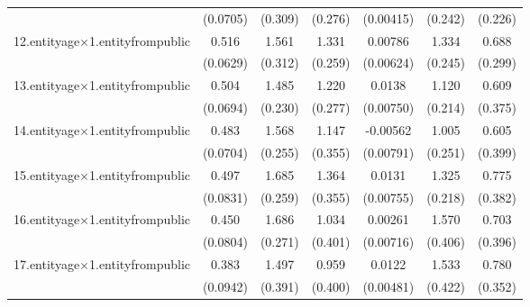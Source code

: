 {\begin{tabular}{l*{6}{c}}
            &    (0.0705)         &     (0.309)         &     (0.276)         &   (0.00415)         &     (0.242)         &     (0.226)         \\
[1em]
12.entityage$\times$1.entityfrompublic&       0.516\sym{***}&       1.561\sym{***}&       1.331\sym{***}&     0.00786         &       1.334\sym{***}&       0.688\sym{*}  \\
            &    (0.0629)         &     (0.312)         &     (0.259)         &   (0.00624)         &     (0.245)         &     (0.299)         \\
[1em]
13.entityage$\times$1.entityfrompublic&       0.504\sym{***}&       1.485\sym{***}&       1.220\sym{***}&      0.0138         &       1.120\sym{***}&       0.609         \\
            &    (0.0694)         &     (0.230)         &     (0.277)         &   (0.00750)         &     (0.214)         &     (0.375)         \\
[1em]
14.entityage$\times$1.entityfrompublic&       0.483\sym{***}&       1.568\sym{***}&       1.147\sym{**} &    -0.00562         &       1.005\sym{***}&       0.605         \\
            &    (0.0704)         &     (0.255)         &     (0.355)         &   (0.00791)         &     (0.251)         &     (0.399)         \\
[1em]
15.entityage$\times$1.entityfrompublic&       0.497\sym{***}&       1.685\sym{***}&       1.364\sym{***}&      0.0131         &       1.325\sym{***}&       0.775         \\
            &    (0.0831)         &     (0.259)         &     (0.355)         &   (0.00755)         &     (0.218)         &     (0.382)         \\
[1em]
16.entityage$\times$1.entityfrompublic&       0.450\sym{***}&       1.686\sym{***}&       1.034\sym{*}  &     0.00261         &       1.570\sym{***}&       0.703         \\
            &    (0.0804)         &     (0.271)         &     (0.401)         &   (0.00716)         &     (0.406)         &     (0.396)         \\
[1em]
17.entityage$\times$1.entityfrompublic&       0.383\sym{***}&       1.497\sym{***}&       0.959\sym{*}  &      0.0122\sym{*}  &       1.533\sym{***}&       0.780\sym{*}  \\
            &    (0.0942)         &     (0.391)         &     (0.400)         &   (0.00481)         &     (0.422)         &     (0.352)         \\

\end{tabular}}

